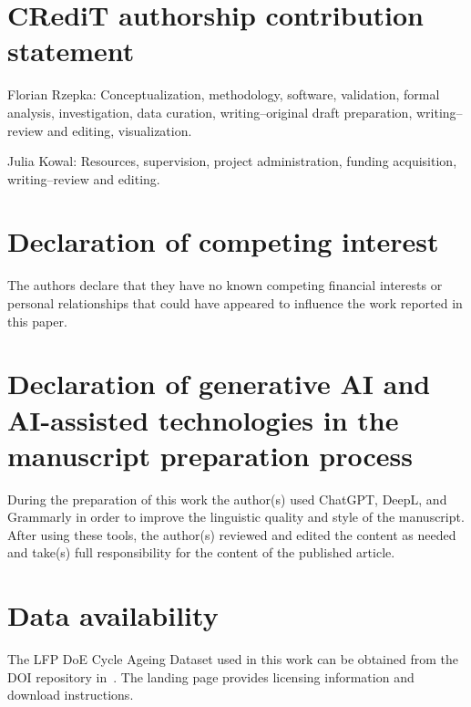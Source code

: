 \documentclass[final,3p,times]{elsarticle}
\begin{document}
\section*{CRediT authorship contribution statement}
Florian Rzepka: Conceptualization, methodology, software, validation, formal analysis, investigation, data curation, writing--original draft preparation, writing--review and editing, visualization.

Julia Kowal: Resources, supervision, project administration, funding acquisition, writing--review and editing.

\section*{Declaration of competing interest}
The authors declare that they have no known competing financial interests or personal relationships that could have appeared to influence the work reported in this paper.

\section*{Declaration of generative AI and AI-assisted technologies in the manuscript preparation process}
During the preparation of this work the author(s) used ChatGPT, DeepL, and Grammarly in order to improve the linguistic quality and style of the manuscript. After using these tools, the author(s) reviewed and edited the content as needed and take(s) full responsibility for the content of the published article.

\section*{Data availability}
The LFP DoE Cycle Ageing Dataset used in this work can be obtained from the DOI repository in~\cite{LFP_DoE_Cycle_Aging_Dataset}. The landing page provides licensing information and download instructions.



\end{document}
